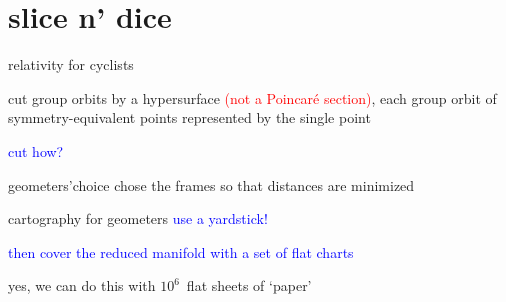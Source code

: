 \section[slice n' dice]{slice n' dice}

\begin{frame}{relativity for cyclists}
\begin{block}{\mslices}

\bigskip
cut group orbits by a hypersurface
\textcolor{red}{(not a Poincar\'e section)}, each group orbit of
symmetry-equivalent points represented by the single point
\end{block}
\bigskip
\textcolor{blue}{\Large cut how?}
\bigskip\bigskip
\begin{block}{geometers'choice}
chose the frames so that distances are minimized
\end{block}
\end{frame}

\begin{frame}{cartography for geometers}
\textcolor{blue}{\Large use a yardstick!}

\bigskip

\textcolor{blue}{then cover the reduced manifold with a set of flat charts}

\hfill
\vfill
yes, we can do this with $10^6$\dmn\ flat sheets of `paper'
\end{frame}


